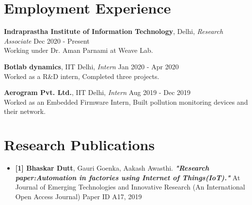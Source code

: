 \documentclass[10pt]{report}
\begin{document}
\section*{\color{BlueViolet}\faSuitcase\hspace{1pt} Employment Experience} 
\vspace{-1em}\item{\textbf{Indraprastha Institute of Information Technology}, Delhi, \textit{Research Associate}} 
\hfill{Dec 2020 - Present}\\
Working under Dr. Aman Parnami at Weave Lab.
\item{\textbf{Botlab dynamics}, IIT Delhi, \textit{Intern}}
\hfill{Jan 2020 - Apr 2020}\\
Worked as a R\&D intern, Completed three projects.
\item{\textbf{Aerogram Pvt. Ltd.}, IIT Delhi, \textit{Intern}  }
\hfill{Aug 2019 - Dec 2019}\\
Worked as an Embedded Firmware Intern, Built pollution monitoring devices and their network.\vspace{-1em}
\section*{\color{BlueViolet}\faUniversity\hspace{1pt} Research Publications}
\begin{itemize}
\vspace{-1em}\item \textbf{[1] Bhaskar Dutt}, Gauri Goenka, Aakash Awasthi. \textbf{\textit{"Research paper:Automation in factories using Internet of Things(IoT)."}} At Journal of Emerging Technologies and Innovative Research (An International Open Access Journal) Paper ID A17, 2019\vspace{-1em} %
\end{itemize}
\end{document}
